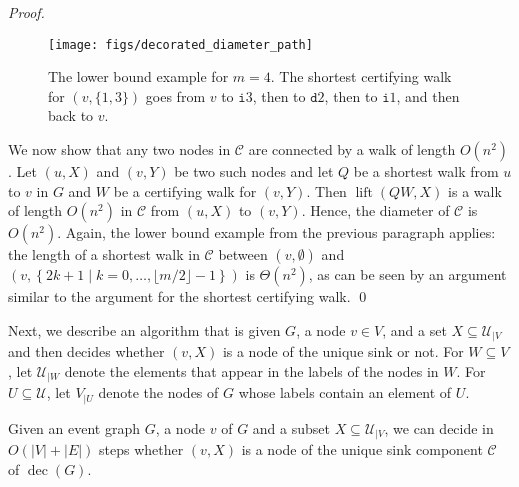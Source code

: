 \documentclass[oribibl,envcountsect,envcountsame]{llncs}
\DeclareMathOperator{\dec}{dec}
\DeclareMathOperator{\lt}{lift}
\newcommand{\C}{\mathcal C}
\newcommand{\U}{\mathcal U}
\begin{document}
\begin{proof}
\begin{figure}
\begin{center}
\texttt{[image: figs/decorated\_diameter\_path]}
\end{center}
\caption{The lower bound example for $m = 4$. The
shortest certifying walk for $(v, \{1,3\})$ goes from $v$ to
$\texttt{i}3$, then to $\texttt{d}2$, then to $\texttt{i}1$, and then back to
$v$.}
\label{fig:large-diameter}
\end{figure}

We now show that any two nodes in $\C$ are connected by a walk of
length $O(n^2)$. 
Let $(u, X)$ and  $(v, Y)$ be two such nodes and let $Q$ be a 
shortest walk from $u$ to $v$ in $G$ and
$W$ be a certifying walk for $(v, Y)$. Then $\lt(QW, X)$ is a walk of length
$O(n^2)$ in $\C$ from $(u, X)$ to $(v, Y)$. Hence, the diameter of
$\C$ is $O(n^2)$. Again, the lower bound example from the previous
paragraph applies: 
the length of a shortest walk in $\C$ between $(v, \emptyset)$ and 
$\left(v, 
\left\{2k +1 \mid k = 0, \ldots, \lfloor m/2 \rfloor - 1 \right\}\right)$ 
is $\Theta(n^2)$, as can be seen by an argument similar to the argument for
the shortest certifying walk.
\qed\end{proof}

Next, we describe an algorithm 
that is given $G$, a node $v \in V$, and a set $X \subseteq \U_{|V}$ and
then decides whether $(v,X)$ is a node of the unique sink or not.
For $W \subseteq V$, let $\U_{|W}$ denote the elements that appear in
the labels of the nodes in $W$. 
For $U \subseteq \U$, let $V_{|U}$ denote the nodes of $G$ whose
labels contain an element of $U$. 

\begin{theorem}\label{thm:decide}
Given an event graph $G$, a node $v$ of $G$ and a subset
$X \subseteq \U_{|V}$, we can decide in $O(|V|+|E|)$ steps
whether $(v,X)$ is a node of the unique sink component $\C$
of $\dec(G)$.
\end{theorem}
\end{document}
